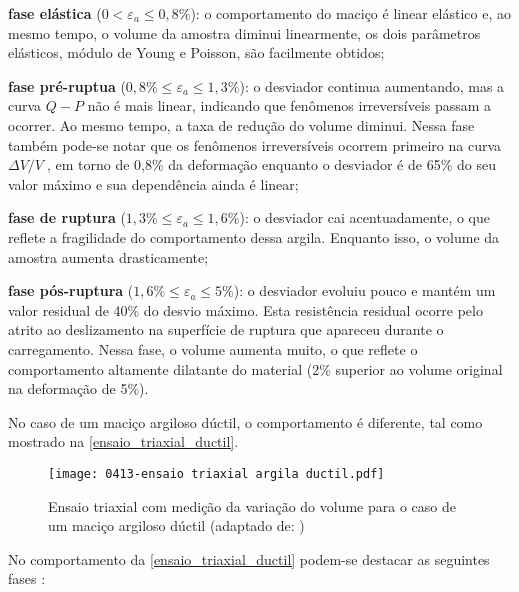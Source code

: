 \begin{alineas}
	
	\item \textbf{fase elástica} ($0 < \varepsilon_a \le 0,8\%$): o comportamento do maciço é linear elástico e, ao mesmo tempo, o volume da amostra diminui linearmente, os dois parâmetros elásticos, módulo de Young e Poisson, são facilmente obtidos;
	
	\item \textbf{fase pré-ruptua} ($0,8\%\le \varepsilon_a \le 1,3\%$): o desviador continua aumentando, mas a curva $Q-P$ não é mais linear, indicando que fenômenos irreversíveis passam a ocorrer. Ao mesmo tempo, a taxa de redução do volume diminui. Nessa fase também pode-se notar que os fenômenos irreversíveis ocorrem primeiro na curva ${\Delta V}/{V}\;$, em torno de 0,8\% da deformação enquanto o desviador é de 65\% do seu valor máximo e sua dependência ainda é linear;
	
	\item \textbf{fase de ruptura} ($1,3\%\le \varepsilon_a \le 1,6\%$): o desviador cai acentuadamente, o que reflete a fragilidade do comportamento dessa argila. Enquanto isso, o volume da amostra aumenta drasticamente;
	
	\item \textbf{fase pós-ruptura} ($1,6\%\le \varepsilon_a \le 5\%$): o desviador evoluiu pouco e mantém um valor residual de 40\% do desvio máximo. Esta resistência residual ocorre pelo atrito ao deslizamento na superfície de ruptura que apareceu durante o carregamento. Nessa fase, o volume aumenta muito, o que reflete o comportamento altamente dilatante do material (2\% superior ao volume original na deformação de 5\%).
	
\end{alineas}

No caso de um maciço argiloso dúctil, o comportamento é diferente, tal como mostrado na \autoref{ensaio_triaxial_ductil}.

\begin{figure}[H]
	\begin{center}
		\texttt{[image: 0413-ensaio triaxial argila ductil.pdf]}
	\end{center}
	\caption{\label{ensaio_triaxial_ductil}Ensaio triaxial com medição da variação do volume para o caso de um maciço argiloso dúctil (adaptado de: )}
\end{figure}

No comportamento da \autoref{ensaio_triaxial_ductil} podem-se destacar as seguintes fases \cite[p. 35]{Rousset1988}:


